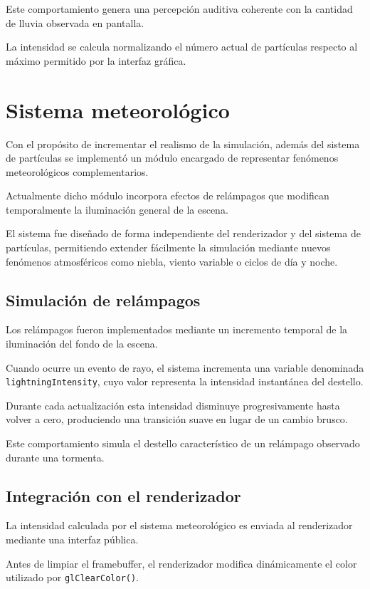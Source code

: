 Este comportamiento genera una percepción auditiva coherente con la cantidad de lluvia observada en pantalla.

La intensidad se calcula normalizando el número actual de partículas respecto al máximo permitido por la interfaz gráfica.

\section{Sistema meteorológico}

Con el propósito de incrementar el realismo de la simulación, además del sistema de partículas se implementó un módulo encargado de representar fenómenos meteorológicos complementarios.

Actualmente dicho módulo incorpora efectos de relámpagos que modifican temporalmente la iluminación general de la escena.

El sistema fue diseñado de forma independiente del renderizador y del sistema de partículas, permitiendo extender fácilmente la simulación mediante nuevos fenómenos atmosféricos como niebla, viento variable o ciclos de día y noche.

\subsection{Simulación de relámpagos}

Los relámpagos fueron implementados mediante un incremento temporal de la iluminación del fondo de la escena.

Cuando ocurre un evento de rayo, el sistema incrementa una variable denominada \texttt{lightningIntensity}, cuyo valor representa la intensidad instantánea del destello.

Durante cada actualización esta intensidad disminuye progresivamente hasta volver a cero, produciendo una transición suave en lugar de un cambio brusco.

Este comportamiento simula el destello característico de un relámpago observado durante una tormenta.

\subsection{Integración con el renderizador}

La intensidad calculada por el sistema meteorológico es enviada al renderizador mediante una interfaz pública.

Antes de limpiar el framebuffer, el renderizador modifica dinámicamente el color utilizado por \texttt{glClearColor()}.

